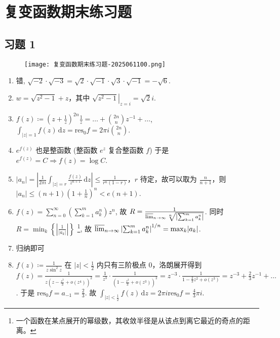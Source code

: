 \section{复变函数期末练习题}

\subsection{习题 1}

\begin{figure}[H]
\centering
\texttt{[image: 复变函数期末练习题-2025061100.png]}
\label{}
\end{figure}

\begin{enumerate}
	\item 错, $\sqrt{ -2 }\cdot \sqrt{ -3 }=\sqrt{ 2 }\cdot \sqrt{ -1 }\cdot \sqrt{ 3 }\cdot \sqrt{ -1 }=-\sqrt{ 6 }$.
	\item $w=\sqrt{ z^{2}-1 }+z$，其中 $\left.\sqrt{ z^{2}-1 }\right|_{z=i}=\sqrt{ 2 }i$.
	\item $f(z)\coloneqq\left( z+\frac{1}{z} \right)^{2n}\frac{1}{z}=\dots+\binom{2n}{n}z^{-1}+\dots$, $\int_{\lvert z \rvert=1}^{} f (z) \, \mathrm{d}z=\mathrm{res}_{0}f=2\pi i\binom{2n}{n}$.
	\item $e^{ f(z) }$ 也是整函数 (整函数 $e^{ z }$ 复合整函数 $f$) 于是 $e^{ f(z) }=C\Rightarrow f(z)=\log C$.
	\item $\lvert a_n \rvert=\left\lvert  \frac{1}{2\pi i}\int_{\lvert z \rvert=r}^{} \frac{f(z)}{z^{n+1}} \, \mathrm{d}z  \right\rvert\leq\frac{1}{r^{n}(1-r)}$，$r$ 待定，故可以取为 $\frac{n}{n+1}$，则 $\lvert a_n \rvert\leq(n+1)\left( 1+\frac{1}{n} \right)^{n}<e(n+1)$.
	\item $f(z)=\sum_{n=0}^{\infty}\left( \sum_{k=1}^{m}a_k^{n} \right)z^{n}$, 故 $R=\frac{1}{\varlimsup_{ n \to \infty }\sqrt[n]{ \left\lvert  \sum_{k=1}^{m}a_k^{n}  \right\rvert }}$. 同时 $R=\min_k\left\{  \left\lvert  \frac{1}{\lvert a_k \rvert}  \right\rvert  \right\}$ \footnote{一个函数在某点展开的幂级数，其收敛半径是从该点到离它最近的奇点的距离。}, 故 $\varlimsup_{ n \to \infty }\left\lvert  \sum_{k=1}^{m}a_k^{n}  \right\rvert ^{1/n }=\max_{k}\lvert a_k \rvert$.
	\item 归纳即可
	\item $f (z)\coloneqq \frac{1}{z\sin ^{2}z}$ 在 $\lvert z \rvert<\frac{1}{2}$ 内只有三阶极点 $0$，洛朗展开得到 $f(z)=\frac{1}{z\left( z-\frac{z^{3}}{3}+o(z^{4}) \right)^{2}}=\frac{1}{z^{3}}\cdot\frac{1}{\left( 1-\frac{z^{2}}{3}+o(z^{3}) \right)^{2}}=z^{-3}\cdot\frac{1}{1-\frac{2}{3}z^{2}+o(z^{3})}=z^{-3}+\frac{2}{3}z^{-1}+\dots$. 于是 $\mathrm{res}_{0}f=a_{-1}=\frac{2}{3}$. 故 $\int_{\lvert z \rvert<\frac{1}{2}}^{} f (z) \, \mathrm{d}z=2\pi i\mathrm{res}_{0}f=\frac{4}{3}\pi i$.

\end{enumerate}
